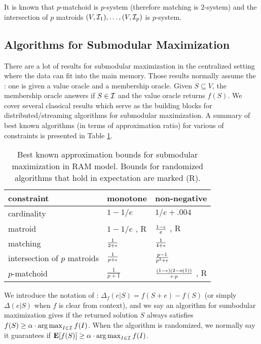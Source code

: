 It is known that $p$-matchoid is $p$-system (therefore matching is $2$-system) and the intersection of $p$ matroids $(V, \mathcal{I}_1), \ldots, (V, \mathcal{I}_p)$ is $p$-system. 





\subsection{Algorithms for Submodular Maximization}
There are a lot of results for submodular maximization in the centralized setting where the data can fit into the main memory. Those results normally assume the : one is given a value oracle and a membership oracle. Given $S\subseteq V$, the membership oracle answers if $S \in \mathcal{I}$ and the value oracle returns $f(S)$. We cover several classical results which serve as the building blocks for distributed/streaming algorithms for submodular maximization. A summary of best known algorithms (in terms of approximation ratio) for various of constraints is presented in Table \ref{table:centralized}.
\begin{table}[t]
\centering
\begin{tabular}{|l|l|l|}
\hline
constraint & monotone  &  non-negative \\
\hline
cardinality & $1 - 1/e$  \cite{NWF78} & $1/e + .004$ \cite{BFN+14}\\
\hline
matroid & $1 - 1/e$ \cite{CCP+11}, R & $\frac{1 - \epsilon}{e}$ \cite{FNS11}, R \\
\hline
matching & $\frac{1}{2 + \epsilon}$ \cite{FNS+11} & $\frac{1}{4 + \epsilon}$ \cite{FNS+11}\\
\hline
intersection of $p$ matroids & $\frac{1}{p + \epsilon}$ \cite{LSV10} & $\frac{p - 1}{p^2 + \epsilon}$ \cite{LSV10}\\
\hline
$p$-matchoid & $\frac{1}{p + 1}$ \cite{CCP+11,NWF78} & $\frac{(1-\epsilon)(2-o(1))}{e\cdot p}$ \cite{FNS+11,VCZ11}, R\\
\hline
\end{tabular}
\caption{Best known approximation bounds for submodular maximization in RAM model. Bounds for randomized algorithms that hold in expectation are marked (R).}
\label{table:centralized}
\end{table}






We introduce the notation of : $\Delta_f(e|S) = f(S + e) - f(S)$ (or simply $\Delta(e|S)$ when $f$ is clear from context), and we say an algorithm for sumbodular maximization gives  if the returned solution $S$ always satisfies  $f(S) \geq \alpha \cdot \operatorname*{arg\,max}_{I\in\mathcal{I}}f(I)$. When the algorithm is randomized, we normally say it guarantees  if $\mathbf{E}[f(S)] \geq \alpha\cdot \operatorname*{arg\,max}_{I\in\mathcal{I}}f(I)$.


